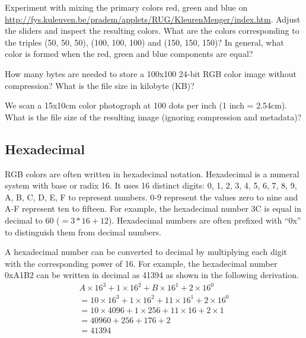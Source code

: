 \documentclass{book}
\begin{document}
\begin{exercise}
Experiment with mixing the primary colors red, green and blue on \href{http://fys.kuleuven.be/pradem/applets/RUG/KleurenMenger/index.htm}{http://fys.kuleuven.be/pradem/applets/RUG/KleurenMenger/index.htm}. Adjust the sliders and inspect the resulting colors. What are the colors corresponding to the triples (50, 50, 50), (100, 100, 100) and (150, 150, 150)? In general, what color is formed when the red, green and blue components  are equal?
\end{exercise}

\begin{exercise}
How many bytes are needed to store a 100x100 24-bit RGB color image without compression? What is the file size in kilobyte (KB)?
\end{exercise}

\begin{exercise}
We scan a 15x10cm color photograph at 100 dots per inch (1 inch = 2.54cm). What is the file size of the resulting image (ignoring compression and metadata)? 
\end{exercise}

\subsection*{Hexadecimal}
RGB colors are often written in hexadecimal notation. Hexadecimal is a numeral system with base or radix 16. It uses 16 distinct digits: 0, 1, 2, 3, 4, 5, 6, 7, 8, 9, A, B, C, D, E, F to represent numbers. 0-9 represent the values zero to nine and A-F represent ten to fifteen. For example, the hexadecimal number 3C is equal in decimal to 60 ($=3*16 + 12$). Hexadecimal numbers are often prefixed with ``0x'' to distinguish them from decimal numbers.

A hexadecimal number can be converted to decimal by multiplying each digit with the corresponding power of 16. For example, the hexadecimal number 0xA1B2 can be written in decimal as 41394 as shown in the following derivation.
$$\begin{array}{l}
A \times 16^3 + 1 \times 16^2 + B \times 16^1 + 2 \times 16^0\\
= 10 \times 16^3 + 1 \times 16^2 + 11 \times 16^1 + 2 \times 16^0\\
= 10 \times 4096 + 1 \times 256 + 11 \times 16 + 2 \times 1\\
= 40960 + 256 + 176 + 2\\
= 41394
\end{array}$$
\end{document}
